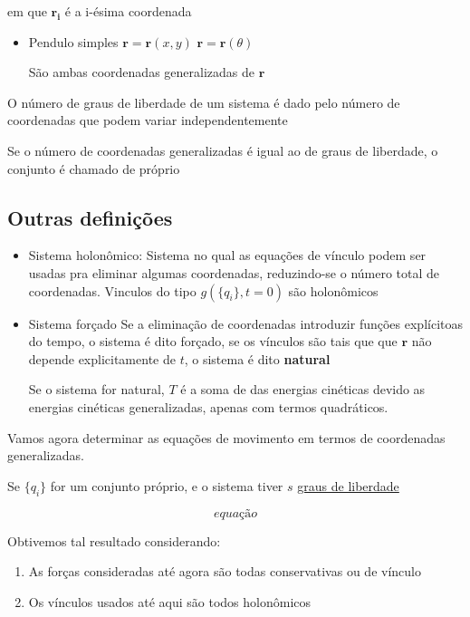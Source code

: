\documentclass[11pt]{article}
\begin{document}
em que \(\mathbf{r_i}\) é a i-ésima coordenada

\begin{itemize}
\item Pendulo simples
\(\mathbf{r} = \mathbf{r}(x,y)\)
\(\mathbf{r} = \mathbf{r}(\theta)\)

São ambas coordenadas generalizadas de \(\mathbf{r}\)
\end{itemize}

O número de graus de liberdade de um sistema é dado pelo número de
coordenadas que podem variar independentemente

Se o número de coordenadas generalizadas é igual ao de graus de liberdade, o
conjunto é chamado de próprio
\subsection{Outras definições}
\label{sec:orgac67196}
\begin{itemize}
\item Sistema holonômico:
Sistema no qual as equações de vínculo podem ser usadas pra eliminar
algumas coordenadas, reduzindo-se o número total de coordenadas. Vinculos
do tipo \(g(\{q_i\},t = 0)\) são holonômicos
\item Sistema forçado
Se a eliminação de coordenadas introduzir funções explícitoas do tempo, o
sistema é dito forçado, se os vínculos são tais que que \(\mathbf{r}\)
não depende explicitamente de \(t\), o sistema é dito \textbf{natural}

Se o sistema for natural, \(T\) é a soma de das energias cinéticas devido as
energias cinéticas generalizadas, apenas com termos quadráticos.
\end{itemize}

Vamos agora determinar as equações de movimento em termos de coordenadas
generalizadas.

Se \(\{q_i\}\) for um conjunto próprio, e o sistema tiver \(s\) \uline{graus de liberdade}

  \begin{equation}
equação
  \end{equation}

Obtivemos tal resultado considerando:
\begin{enumerate}
\item As forças consideradas até agora são todas conservativas ou de vínculo
\item Os vínculos usados até aqui são todos holonômicos
\end{enumerate}
\end{document}
